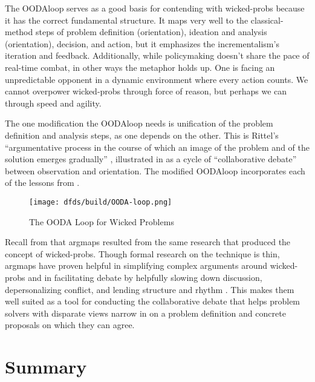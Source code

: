 The \ac{OODAloop} serves as a good basis for contending with \acp{wicked-prob} because it has the correct fundamental
structure. It maps very well to the \ac{classical-method} steps of problem definition (orientation), ideation and
analysis (orientation), decision, and action, but it emphasizes the \ac{incrementalism}'s iteration and feedback.
Additionally, while policymaking doesn't share the pace of real-time combat, in other ways the metaphor holds up. One is
facing an unpredictable opponent in a dynamic environment where every action counts. We cannot overpower
\acp{wicked-prob} through force of reason, but perhaps we can through speed and agility.

The one modification the \ac{OODAloop} needs is unification of the problem definition and analysis steps, as one depends
on the other. This is Rittel's ``argumentative process in the course of which an image of the problem and of the
solution emerges gradually'' \cite{rittel_dilemmas_1973}, illustrated in  as a cycle of
``collaborative debate'' between observation and orientation. The modified \ac{OODAloop} incorporates each of the
lessons from .

\begin{figure}[h]
    \centering\CaptionFontSize
    \texttt{[image: dfds/build/OODA-loop.png]}
    \caption[The OODA Loop for Wicked Problems]{The OODA Loop for Wicked Problems}
    \label{fig-policy-ooda-loop}
\end{figure}


Recall from  that \acp{argmap} resulted from the same research that produced the concept of
\acp{wicked-prob}. Though formal research on the technique is thin, \acp{argmap} have proven helpful in simplifying
complex arguments around \acp{wicked-prob} \cite{renton_2007} and in facilitating debate by helpfully slowing down
discussion, depersonalizing conflict, and lending structure and rhythm \cite{dutoit_hypermedia_2006}. This makes them
well suited as a tool for conducting the collaborative debate that helps problem solvers with disparate views narrow in
on a problem definition and concrete proposals on which they can agree.


\section{Summary}

